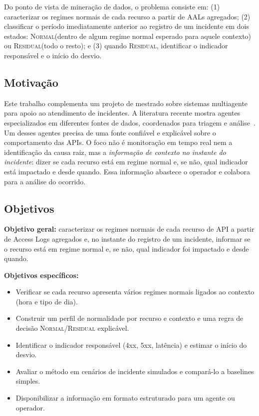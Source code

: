 \documentclass[sigconf,nonacm]{acmart}
\newcommand{\Normal}{\textsc{Normal}\xspace}
\newcommand{\Residual}{\textsc{Residual}\xspace}
\begin{document}
Do ponto de vista de mineração de dados, o problema consiste em: (1) caracterizar os regimes normais de cada recurso a partir de AALs agregados; (2) classificar o período imediatamente anterior ao registro de um incidente em dois estados: \Normal (dentro de algum regime normal esperado para aquele contexto) ou \Residual (todo o resto); e (3) quando \Residual, identificar o indicador responsável e o início do desvio.

\subsection{Motivação}
Este trabalho complementa um projeto de mestrado sobre sistemas multiagente para apoio ao atendimento de incidentes. A literatura recente mostra agentes especializados em diferentes fontes de dados, coordenados para triagem e análise~\citep{yu2025triangle,luo2025opsagent,zhang2025isre}. Um desses agentes precisa de uma fonte confiável e explicável sobre o comportamento das APIs. O foco não é monitoração em tempo real nem a identificação da causa raiz, mas a \emph{informação de contexto no instante do incidente}: dizer se cada recurso está em regime normal e, se não, qual indicador está impactado e desde quando. Essa informação abastece o operador e colabora para a análise do ocorrido.

\subsection{Objetivos}
\textbf{Objetivo geral:} caracterizar os regimes normais de cada recurso de API a partir de Access Logs agregados e, no instante do registro de um incidente, informar se o recurso está em regime normal e, se não, qual indicador foi impactado e desde quando.

\textbf{Objetivos específicos:}
\begin{itemize}
  \item Verificar se cada recurso apresenta vários regimes normais ligados ao contexto (hora e tipo de dia).
  \item Construir um perfil de normalidade por recurso e contexto e uma regra de decisão \Normal/\Residual explicável.
  \item Identificar o indicador responsável (4xx, 5xx, latência) e estimar o início do desvio.
  \item Avaliar o método em cenários de incidente simulados e compará-lo a baselines simples.
  \item Disponibilizar a informação em formato estruturado para um agente ou operador.
\end{itemize}
\end{document}

